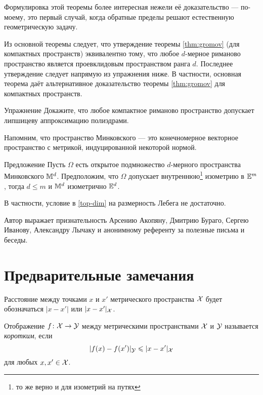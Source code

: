 \documentclass[oneside,a4paper]{article}
\begin{document}
Формулировка этой теоремы более интересная нежели её доказательство ---  по-моему, это первый случай, когда обратные пределы решают естественную геометрическую задачу.

Из основной теоремы следует, что утверждение теоремы \ref{thm:gromov} (для компактных пространств) эквивалентно 
тому, что любое $d$-мерное риманово пространство является проевклидовым пространством ранга $d$.
Последнее утверждение следует напрямую из упражнения ниже.
В частности, основная теорема даёт альтернативное доказательство теоремы  \ref{thm:gromov} для компактных пространств.

\begin{thm}{Упражнение}
Докажите, что любое компактное риманово пространство допускает липшицеву аппроксимацию полиэдрами.
\end{thm}


Напомним, что пространство Минковского --- это конечномерное векторное пространство с метрикой, индуцированной некоторой нормой.

\begin{thm}{Предложение}\label{minkowski}
Пусть $\Omega$ есть открытое подмножество $d$-мерного пространства Минковского $\mathbb{M}^d$.
Предположим, что $\Omega$ допускает внутреннюю\footnote{то же верно и для изометрий на путях} изометрию в $\mathbb{E}^m$, тогда $d\le m$ и $\mathbb{M}^d$ изометрично $\mathbb{E}^d$.
\end{thm}
В частности, условие в \ref{top-dim} на размерность Лебега не достаточно.

\smallskip

Автор выражает признательность Арсению Акопяну, Дмитрию Бураго, Сергею Иванову, Александру Лычаку и анонимному референту за полезные письма и беседы.






\section{Предварительные замечания}\label{preliminaries}

Расстояние между точками $x$ и $x'$ метрического пространства $\mathcal{X}$ будет обозначаться $|x -x'|$ или $|x -x'|_{\mathcal{X}}$.

Отображение $f\colon\mathcal{X}\to \mathcal{Y}$ между метрическими пространствами $\mathcal{X}$ и $\mathcal{Y}$ называется \emph{коротким},
если  
$$|f(x)-f(x')|_{\mathcal{Y}}\leqslant |x -x'|_{\mathcal{X}}$$
для любых $x,x'\in \mathcal{X}$.
\end{document}
